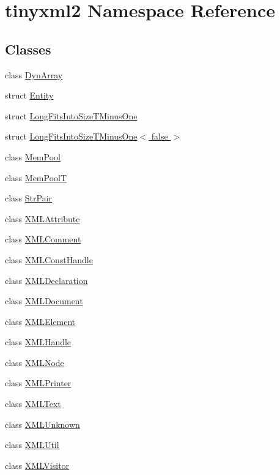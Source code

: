 \hypertarget{namespacetinyxml2}{}\section{tinyxml2 Namespace Reference}
\label{namespacetinyxml2}
\subsection*{Classes}
\begin{DoxyCompactItemize}
\item 
class \hyperlink{classtinyxml2_1_1_dyn_array}{Dyn\+Array}
\item 
struct \hyperlink{structtinyxml2_1_1_entity}{Entity}
\item 
struct \hyperlink{structtinyxml2_1_1_long_fits_into_size_t_minus_one}{Long\+Fits\+Into\+Size\+T\+Minus\+One}
\item 
struct \hyperlink{structtinyxml2_1_1_long_fits_into_size_t_minus_one_3_01false_01_4}{Long\+Fits\+Into\+Size\+T\+Minus\+One$<$ false $>$}
\item 
class \hyperlink{classtinyxml2_1_1_mem_pool}{Mem\+Pool}
\item 
class \hyperlink{classtinyxml2_1_1_mem_pool_t}{Mem\+PoolT}
\item 
class \hyperlink{classtinyxml2_1_1_str_pair}{Str\+Pair}
\item 
class \hyperlink{classtinyxml2_1_1_x_m_l_attribute}{X\+M\+L\+Attribute}
\item 
class \hyperlink{classtinyxml2_1_1_x_m_l_comment}{X\+M\+L\+Comment}
\item 
class \hyperlink{classtinyxml2_1_1_x_m_l_const_handle}{X\+M\+L\+Const\+Handle}
\item 
class \hyperlink{classtinyxml2_1_1_x_m_l_declaration}{X\+M\+L\+Declaration}
\item 
class \hyperlink{classtinyxml2_1_1_x_m_l_document}{X\+M\+L\+Document}
\item 
class \hyperlink{classtinyxml2_1_1_x_m_l_element}{X\+M\+L\+Element}
\item 
class \hyperlink{classtinyxml2_1_1_x_m_l_handle}{X\+M\+L\+Handle}
\item 
class \hyperlink{classtinyxml2_1_1_x_m_l_node}{X\+M\+L\+Node}
\item 
class \hyperlink{classtinyxml2_1_1_x_m_l_printer}{X\+M\+L\+Printer}
\item 
class \hyperlink{classtinyxml2_1_1_x_m_l_text}{X\+M\+L\+Text}
\item 
class \hyperlink{classtinyxml2_1_1_x_m_l_unknown}{X\+M\+L\+Unknown}
\item 
class \hyperlink{classtinyxml2_1_1_x_m_l_util}{X\+M\+L\+Util}
\item 
class \hyperlink{classtinyxml2_1_1_x_m_l_visitor}{X\+M\+L\+Visitor}
\end{DoxyCompactItemize}
